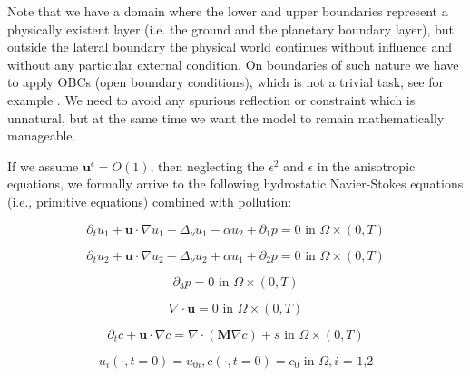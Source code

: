 \documentclass[12pt]{report}
\numberwithin{theorem}{chapter}
\numberwithin{corollary}{chapter}
\numberwithin{lemma}{chapter}
\numberwithin{remark}{chapter}
\numberwithin{definition}{chapter}
\numberwithin{prop}{chapter}
\begin{document}
Note that we have a domain where the lower and upper boundaries represent a physically existent layer (i.e. the ground and the planetary boundary layer), but outside the lateral boundary the physical world continues without influence and without any particular external condition. On boundaries of such nature we have to apply OBCs (open boundary conditions), which is not a trivial task, see for example \cite{wang2014ocean}. We need to avoid any spurious reflection or constraint which is unnatural, but at the same time we want the model to remain mathematically manageable.

If we assume $\mathbf{u}^\epsilon = O(1)$, then neglecting the $\epsilon^2$ and $\epsilon$ in the anisotropic equations, we formally arrive to the following hydrostatic Navier-Stokes equations (i.e., primitive equations) combined with pollution:

\begin{equation} \label{HNSC1_coordinates_GFC_intro}    
  \partial_t u_1 + \mathbf{u} \cdot \nabla u_1 - \Delta_\nu u_1 - \alpha u_2 + \partial_1 p = 0 \text{ in } \Omega \times (0,T)
\end{equation}

\begin{equation} \label{HNSC2_coordinates_GFC_intro}   
  \partial_t u_2 + \mathbf{u} \cdot \nabla u_2 - \Delta_\nu u_2 + \alpha u_1 + \partial_2 p = 0 \text{ in } \Omega \times (0,T)
\end{equation}

\begin{equation} \label{HNSC3_coordinates_GFC_intro}   
  \partial_3 p = 0 \text{ in } \Omega \times (0,T)
\end{equation}

\begin{equation} \label{HNSC4_coordinates_GFC_intro}
  \nabla \cdot \mathbf{u} = 0 \text{ in } \Omega \times (0,T)
\end{equation}

\begin{equation} \label{HNSC5_coordinates_GFC_intro}   
  \partial_t c + \mathbf{u} \cdot \nabla c = \nabla \cdot (\mathbf{M} \nabla c) + s \text{ in } \Omega \times (0,T)
\end{equation}

\begin{equation} \label{HNSC_init_coordinates_GFC_intro}   
  u_i (\cdot, t=0) = u_{0 i}, c (\cdot, t=0) = c_0 \text{ in } \Omega, \text{$i$ = 1,2}
\end{equation}
\end{document}
